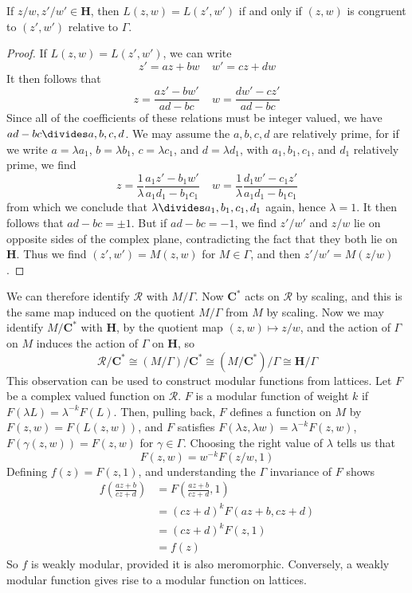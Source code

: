 \begin{theorem}
    If $z/w, z'/w' \in \mathbf{H}$, then $L(z,w) = L(z',w')$ if and only if $(z,w)$ is congruent to $(z',w')$ relative to $\Gamma$.
\end{theorem}
\begin{proof}
    If $L(z,w) = L(z',w')$, we can write
    \[ z' = az + bw\ \ \ \ \ w' = cz + dw \]
    It then follows that
    \[ z = \frac{az' - bw'}{ad - bc}\ \ \ \ \ w = \frac{dw' - cz'}{ad-bc} \]
    Since all of the coefficients of these relations must be integer valued, we have $ad - bc \divides a,b,c,d$. We may assume the $a,b,c,d$ are relatively prime, for if we write $a = \lambda a_1$, $b = \lambda b_1$, $c = \lambda c_1$, and $d = \lambda d_1$, with $a_1, b_1, c_1$, and $d_1$ relatively prime, we find
    \[ z = \frac{1}{\lambda} \frac{a_1 z' - b_1 w'}{a_1 d_1 - b_1 c_1} \ \ \ \ \ w =  \frac{1}{\lambda} \frac{d_1 w' - c_1 z'}{a_1 d_1 - b_1 c_1} \]
    from which we conclude that $\lambda \divides a_1, b_1, c_1, d_1$ again, hence $\lambda = 1$. It then follows that $ad - bc = \pm 1$. But if $ad - bc = -1$, we find $z'/w'$ and $z/w$ lie on opposite sides of the complex plane, contradicting the fact that they both lie on $\mathbf{H}$. Thus we find $(z',w') = M(z,w)$ for $M \in \Gamma$, and then $z'/w' = M(z/w)$.
\end{proof}

We can therefore identify $\mathcal{R}$ with $M/\Gamma$. Now $\mathbf{C}^*$ acts on $\mathcal{R}$ by scaling, and this is the same map induced on the quotient $M/\Gamma$ from $M$ by scaling. Now we may identify $M/\mathbf{C}^*$ with $\mathbf{H}$, by the quotient map $(z,w) \mapsto z/w$, and the action of $\Gamma$ on $M$ induces the action of $\Gamma$ on $\mathbf{H}$, so
%
\[ \mathcal{R}/\mathbf{C}^* \cong (M/\Gamma)/\mathbf{C}^* \cong (M/\mathbf{C}^*)/\Gamma \cong \mathbf{H}/\Gamma \]
%
This observation can be used to construct modular functions from lattices. Let $F$ be a complex valued function on $\mathcal{R}$. $F$ is a modular function of weight $k$ if $F(\lambda L) = \lambda^{-k} F(L)$. Then, pulling back, $F$ defines a function on $M$ by $F(z,w) = F(L(z,w))$, and $F$ satisfies $F(\lambda z, \lambda w) = \lambda^{-k} F(z,w)$, $F(\gamma (z,w)) = F(z,w)$ for $\gamma \in \Gamma$. Choosing the right value of $\lambda$ tells us that
%
\[ F(z,w) = w^{-k} F(z/w, 1) \]
%
Defining $f(z) = F(z,1)$, and understanding the $\Gamma$ invariance of $F$ shows
%
\begin{align*}
    f \left( \frac{az + b}{cz + d} \right) &= F \left( \frac{az + b}{cz + d}, 1 \right)\\
    &= (cz + d)^k F(az + b, cz + d)\\
    &= (cz + d)^k F(z,1)\\
    &= f(z)
\end{align*}
%
So $f$ is weakly modular, provided it is also meromorphic. Conversely, a weakly modular function gives rise to a modular function on lattices.

